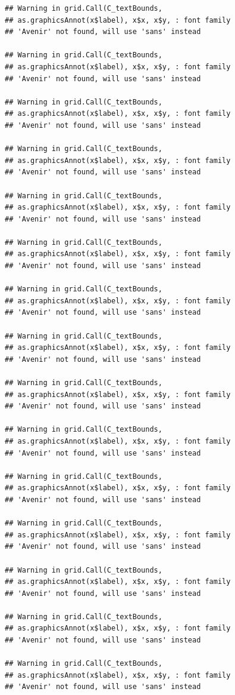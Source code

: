 \documentclass[]{krantz}
\begin{document}
\begin{verbatim}
## Warning in grid.Call(C_textBounds,
## as.graphicsAnnot(x$label), x$x, x$y, : font family
## 'Avenir' not found, will use 'sans' instead

## Warning in grid.Call(C_textBounds,
## as.graphicsAnnot(x$label), x$x, x$y, : font family
## 'Avenir' not found, will use 'sans' instead

## Warning in grid.Call(C_textBounds,
## as.graphicsAnnot(x$label), x$x, x$y, : font family
## 'Avenir' not found, will use 'sans' instead

## Warning in grid.Call(C_textBounds,
## as.graphicsAnnot(x$label), x$x, x$y, : font family
## 'Avenir' not found, will use 'sans' instead

## Warning in grid.Call(C_textBounds,
## as.graphicsAnnot(x$label), x$x, x$y, : font family
## 'Avenir' not found, will use 'sans' instead

## Warning in grid.Call(C_textBounds,
## as.graphicsAnnot(x$label), x$x, x$y, : font family
## 'Avenir' not found, will use 'sans' instead

## Warning in grid.Call(C_textBounds,
## as.graphicsAnnot(x$label), x$x, x$y, : font family
## 'Avenir' not found, will use 'sans' instead

## Warning in grid.Call(C_textBounds,
## as.graphicsAnnot(x$label), x$x, x$y, : font family
## 'Avenir' not found, will use 'sans' instead

## Warning in grid.Call(C_textBounds,
## as.graphicsAnnot(x$label), x$x, x$y, : font family
## 'Avenir' not found, will use 'sans' instead

## Warning in grid.Call(C_textBounds,
## as.graphicsAnnot(x$label), x$x, x$y, : font family
## 'Avenir' not found, will use 'sans' instead

## Warning in grid.Call(C_textBounds,
## as.graphicsAnnot(x$label), x$x, x$y, : font family
## 'Avenir' not found, will use 'sans' instead

## Warning in grid.Call(C_textBounds,
## as.graphicsAnnot(x$label), x$x, x$y, : font family
## 'Avenir' not found, will use 'sans' instead

## Warning in grid.Call(C_textBounds,
## as.graphicsAnnot(x$label), x$x, x$y, : font family
## 'Avenir' not found, will use 'sans' instead

## Warning in grid.Call(C_textBounds,
## as.graphicsAnnot(x$label), x$x, x$y, : font family
## 'Avenir' not found, will use 'sans' instead

## Warning in grid.Call(C_textBounds,
## as.graphicsAnnot(x$label), x$x, x$y, : font family
## 'Avenir' not found, will use 'sans' instead
\end{verbatim}
\end{document}
